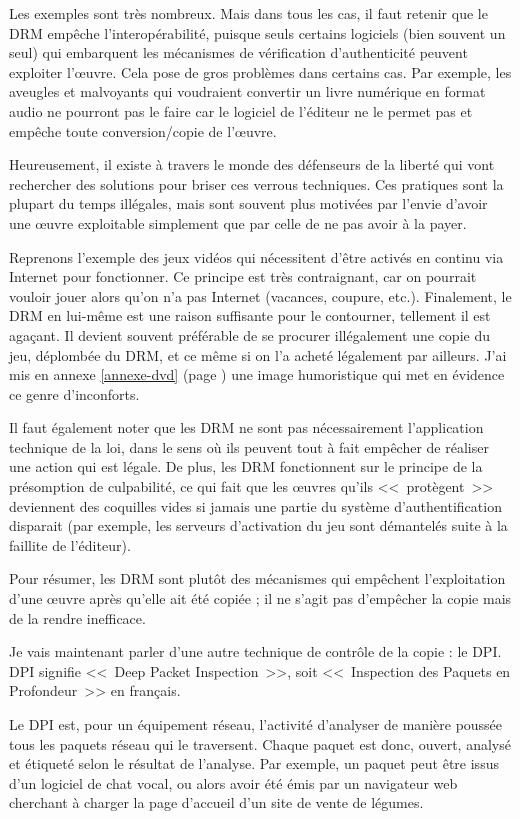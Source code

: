 Les exemples sont très nombreux.
Mais dans tous les cas, il faut retenir que le DRM empêche l'interopérabilité, puisque seuls certains logiciels (bien souvent un seul) qui embarquent les mécanismes de vérification d'authenticité peuvent exploiter l'œuvre.
Cela pose de gros problèmes dans certains cas.
Par exemple, les aveugles et malvoyants qui voudraient convertir un livre numérique en format audio ne pourront pas le faire car le logiciel de l'éditeur ne le permet pas et empêche toute conversion/copie de l'œuvre.

Heureusement, il existe à travers le monde des défenseurs de la liberté qui vont rechercher des solutions pour briser ces verrous techniques.
Ces pratiques sont la plupart du temps illégales, mais sont souvent plus motivées par l'envie d'avoir une œuvre exploitable simplement que par celle de ne pas avoir à la payer.

Reprenons l'exemple des jeux vidéos qui nécessitent d'être activés en continu via Internet pour fonctionner.
Ce principe est très contraignant, car on pourrait vouloir jouer alors qu'on n'a pas Internet (vacances, coupure, etc.).
Finalement, le DRM en lui-même est une raison suffisante pour le contourner, tellement il est agaçant.
Il devient souvent préférable de se procurer illégalement une copie du jeu, déplombée du DRM, et ce même si on l'a acheté légalement par ailleurs.
J'ai mis en annexe \ref*{annexe-dvd} (page \pageref{annexe-dvd}) une image humoristique qui met en évidence ce genre d'inconforts.

Il faut également noter que les DRM ne sont pas nécessairement l'application technique de la loi, dans le sens où ils peuvent tout à fait empêcher de réaliser une action qui est légale.
De plus, les DRM fonctionnent sur le principe de la présomption de culpabilité, ce qui fait que les œuvres qu'ils <<~protègent~>> deviennent des coquilles vides si jamais une partie du système d'authentification disparait (par exemple, les serveurs d'activation du jeu sont démantelés suite à la faillite de l'éditeur).

Pour résumer, les DRM sont plutôt des mécanismes qui empêchent l'exploitation d'une œuvre après qu'elle ait été copiée ; il ne s'agit pas d'empêcher la copie mais de la rendre inefficace.

Je vais maintenant parler d'une autre technique de contrôle de la copie : le DPI.
DPI signifie <<~Deep Packet Inspection~>>, soit <<~Inspection des Paquets en Profondeur~>> en français.

Le DPI est, pour un équipement réseau, l'activité d'analyser de manière poussée tous les paquets réseau qui le traversent.
Chaque paquet est donc, ouvert, analysé et étiqueté selon le résultat de l'analyse.
Par exemple, un paquet peut être issus d'un logiciel de chat vocal, ou alors avoir été émis par un navigateur web cherchant à charger la page d'accueil d'un site de vente de légumes.

